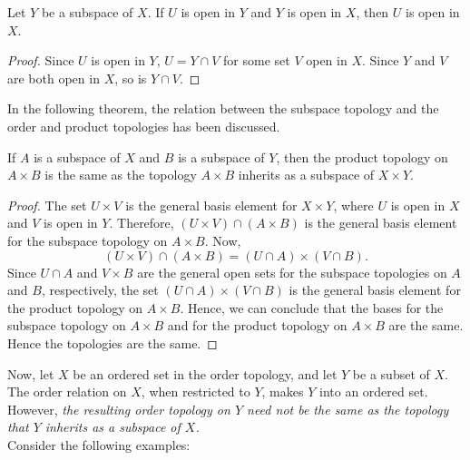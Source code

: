 \documentclass[a4paper,english,12pt]{article}
\begin{document}
\begin{lem}
	Let $Y$ be a subspace of $X$. If $U$ is open in $Y$ and $Y$ is open in $X$, then $U$ is open in $X$.
\end{lem}
\begin{proof}
	Since $U$ is open in $Y$, $U = Y \cap V$ for some set $V$ open in $X$. Since $Y$ and $V$ are both open in $X$, so is $Y \cap V$.
\end{proof}

In the following theorem, the relation between the subspace topology and the order and product topologies has been discussed.

\begin{thm}
	If $A$ is a subspace of $X$ and $B$ is a subspace of $Y$, then the product
	topology on $A \times B$ is the same as the topology $A \times B$ inherits as a subspace of $X \times Y$.
\end{thm}

\begin{proof}
	The set $U \times V$ is the general basis element for $X \times Y$, where $U$ is open in $X$ and $V$ is open in $Y$. Therefore, $(U \times V) \cap (A \times B)$ is the general basis element for the subspace topology on $A \times B$. Now,
	\[ (U \times V) \cap (A \times B) = (U \cap A) \times (V \cap B). \]
	Since $U \cap A$ and $V \times B$ are the general open sets for the subspace topologies on $A$ and $B$, respectively, the set $(U \cap A) \times (V \cap B)$ is the general basis element for the product topology on $A \times B$.
	Hence, we can conclude that the bases for the subspace topology on $A \times B$ and for the product topology on $A \times B$ are the same. Hence the topologies are the same.
\end{proof}

Now, let $X$ be an ordered set in the order topology, and let $Y$ be a subset of $X$. The order relation on $X$, when restricted to $Y$, makes $Y$ into an ordered set. However, \textit{the resulting order topology on $Y$ need not be the same as the topology that $Y$ inherits as a subspace of $X$.} \\
Consider the following examples:
\end{document}
